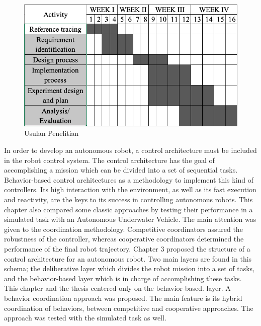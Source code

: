 \begin{figure}[H]
	\centering
	\includegraphics[width=0.9\linewidth]{figure/Chart-ThesisQ.png}
	\caption{Usulan Penelitian}
	\label{fig:chart-thesisq}
\end{figure}


In order to develop an autonomous robot, a control architecture must be included in the robot control system. The control architecture has the goal of accomplishing a mission which can be divided into a set of sequential tasks.  Behavior-based control architectures as a methodology to implement this kind of controllers. Its high interaction with the environment, as well as its fast execution and reactivity, are the keys to its success in controlling autonomous robots. This chapter also compared some classic approaches by testing their performance in a simulated task with an Autonomous Underwater Vehicle. The main attention was given to the coordination methodology. Competitive coordinators assured the robustness of the controller, whereas cooperative coordinators determined the performance of the final robot trajectory. Chapter 3 proposed the structure of a control architecture for an autonomous robot. Two main layers are found in this schema; the deliberative layer which divides the robot mission into a set of tasks, and the behavior-based layer which is in charge of accomplishing these tasks. This chapter and the thesis centered only on the behavior-based. layer. A behavior coordination approach was proposed. The main feature is its hybrid coordination of behaviors, between competitive and cooperative approaches. The approach was tested with the simulated task as well.


